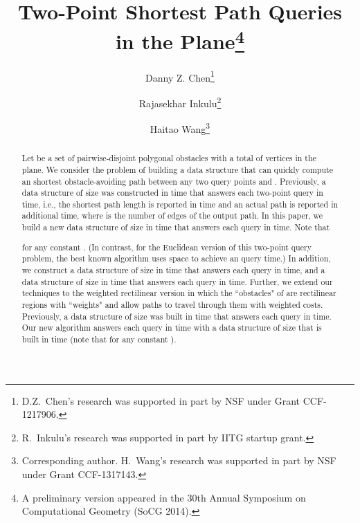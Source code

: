 \documentclass[english,runningheads,11pt]{llncs}
\begin{document}
\title{Two-Point  Shortest Path Queries in the Plane\thanks{A preliminary version appeared in the 30th Annual
Symposium on Computational Geometry (SoCG 2014).}}

\author{Danny Z. Chen\thanks{D.Z.~Chen's research was supported in part by NSF
under Grant CCF-1217906.}
\and Rajasekhar Inkulu\thanks{R.~Inkulu's research was supported in part by IITG startup grant.}
\and
Haitao Wang\thanks{Corresponding author. H.~Wang's research was supported in part by NSF under Grant CCF-1317143.}
}


\maketitle

\setcounter{page}{1}



\begin{abstract}
Let  be a set of  pairwise-disjoint polygonal
obstacles with a total of  vertices in the plane.  We consider the problem of
building a data structure that can quickly compute an  shortest obstacle-avoiding
path between any two query points  and .
Previously, a data structure of
size  was constructed in  time that
answers each two-point query in  time, i.e., the
shortest path length is reported in  time and an
actual path is reported in additional  time, where  is the
number of edges of the output path. In this paper, we build a new data structure
of size  in
 time that
answers each query in  time. Note that

for any constant . (In contrast, for the Euclidean version of this two-point
query problem, the best known algorithm uses  space to achieve an 
query time.) In addition, we construct a data structure of
size  in  time that answers each query in
 time, and a data structure of size 
in  time that answers each query in
 time.  Further, we extend our techniques to the
weighted rectilinear version in which the ``obstacles" of  are rectilinear regions
with ``weights" and allow  paths to travel through them with weighted costs.
Previously,  a data structure of
size  was built in  time that
answers each query in  time.
Our new algorithm answers each query in  time with a
data structure of size  that
is built in  time
(note that  for any constant ).
\end{abstract}
\end{document}

